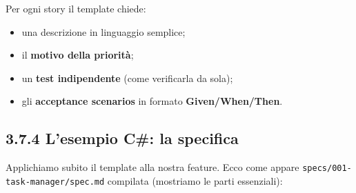 \documentclass[
  italian,
  10pt,
]{book}
\providecommand{\tightlist}{%
  \setlength{\itemsep}{0pt}\setlength{\parskip}{0pt}}
\begin{document}
Per ogni story il template chiede:

\begin{itemize}
\tightlist
\item
  una descrizione in linguaggio semplice;
\item
  il \textbf{motivo della priorità};
\item
  un \textbf{test indipendente} (come verificarla da sola);
\item
  gli \textbf{acceptance scenarios} in formato \textbf{Given/When/Then}.
\end{itemize}

\subsection{3.7.4 L'esempio C\#: la
specifica}\label{lesempio-c-la-specifica}

Applichiamo subito il template alla nostra feature. Ecco come appare
\texttt{specs/001-task-manager/spec.md} compilata (mostriamo le parti
essenziali):
\end{document}
